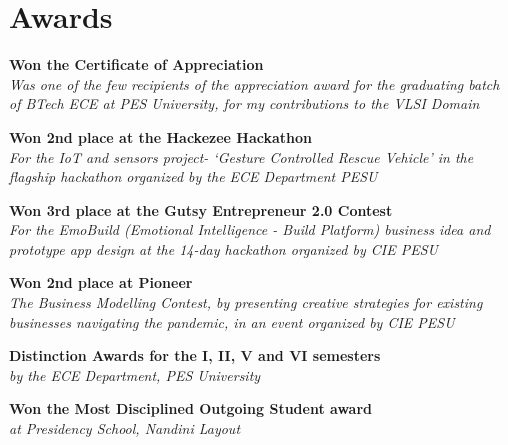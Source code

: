 \section{\sc Awards}


  {\bf{Won the Certificate of Appreciation}}  \\
\textit{Was one of the few recipients of the appreciation award for the graduating batch of BTech ECE at PES University, for my contributions to the VLSI Domain}  


  {\bf{Won 2nd place at the Hackezee Hackathon}} \\ 
\textit{For the IoT and sensors project- ‘Gesture Controlled Rescue Vehicle’ in the flagship hackathon organized by the ECE Department PESU} 

  {\bf{Won 3rd place at the Gutsy Entrepreneur 2.0 Contest}} \\
\textit{For the EmoBuild (Emotional Intelligence - Build Platform) business idea and prototype app design at the 14-day hackathon organized by CIE PESU} 


  {\bf{Won 2nd place at Pioneer}}  \\
\textit{The Business Modelling Contest, by presenting creative strategies for existing businesses navigating the pandemic, in an event organized by CIE PESU} 

  {\bf{Distinction Awards for the I, II, V and VI semesters}} \\
\textit{by the ECE Department, PES University} 


  {\bf{Won the Most Disciplined Outgoing Student award}}   \\
\textit{at Presidency School, Nandini Layout} 

\endinput
